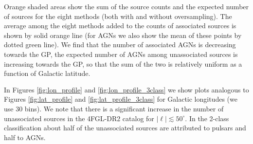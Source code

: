 Orange shaded areas show the sum of the source counts and the expected number of sources for the eight methods (both with and without oversampling).
The average among the eight methods added to the counts of associated sources is shown by solid orange line 
(for AGNs we also show the mean of these points by dotted green line).
We find that the number of associated AGNs is decreasing towards the GP, the expected number of AGNs among unassociated sources is increasing towards the GP, so that the sum of the two is relatively uniform as a function of Galactic latitude.


In Figures \ref{fig:lon_profile} and \ref{fig:lon_profile_3class} we show plots analogous to Figures \ref{fig:lat_profile} and \ref{fig:lat_profile_3class} for Galactic longitudes (we use 30 bins).
We note that there is a significant increase in the number of unassociated sources in the 4FGL-DR2  catalog for $|\ell | \lesssim 50^\circ$.
In the 2-class classification about half of the unassociated sources are attributed to pulsars and half to AGNs.

\begin{table}[!h]
\vspace{2mm}
\caption{Expected counts of sources among unassociated 3FGL sources.}
\label{tab:expected_counts_prob_3FGL}
\end{table}



